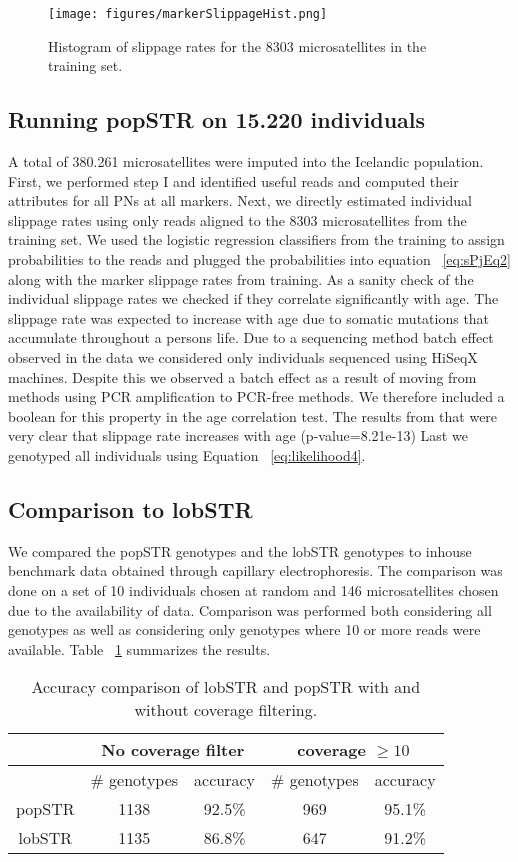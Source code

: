 \documentclass{bioinfo}
\begin{document}
\begin{figure}[H]
\centering
 \texttt{[image: figures/markerSlippageHist.png]}
  \caption[Histogram of marker-slippage]{Histogram of slippage rates for the 8303 microsatellites in the training set.}
 \label{fig:markerSlipp}
\end{figure}

\subsection{Running popSTR on 15.220 individuals}
A total of 380.261 microsatellites were imputed into the Icelandic population.
First, we performed step I and identified useful reads and computed their attributes for all PNs at all markers. Next, we directly estimated individual slippage rates using only reads aligned to the 8303 microsatellites from the training set. We used the logistic regression classifiers from the training to assign probabilities to the reads and plugged the probabilities into equation ~\ref{eq:sPjEq2} along with the marker slippage rates from training. 
As a sanity check of the individual slippage rates we checked if they correlate significantly with age. The slippage rate was expected to increase with age due to somatic mutations that accumulate throughout a persons life. Due to a sequencing method batch effect observed in the data we considered only individuals sequenced using HiSeqX machines. Despite this we observed a batch effect as a result of moving from methods using PCR amplification to PCR-free methods. We therefore included a boolean for this property in the age correlation test. The results from that were very clear that slippage rate increases with age (p-value=8.21e-13)
Last we genotyped all individuals using Equation ~\ref{eq:likelihood4}.

\subsection{Comparison to lobSTR}
We compared the popSTR genotypes and the lobSTR genotypes to inhouse benchmark data obtained through capillary electrophoresis. The comparison was done on a set of 10 individuals chosen at random and 146 microsatellites chosen due to the availability of data. 
Comparison was performed both considering all genotypes as well as considering only genotypes where 10 or more reads were available. Table ~\ref{table:lobSTRcomp} summarizes the results. 
\begin{table}[H]
    \caption{Accuracy comparison of lobSTR and popSTR with and without coverage filtering.}
    \begin{tabular}{ c | c | c | c | c |}
         & \multicolumn{2}{c}{No coverage filter} & \multicolumn{2}{c}{coverage $ \geq 10$} \\
         \hline
         & \# genotypes & accuracy & \# genotypes & accuracy \\
         \hline
        popSTR & 1138 & 92.5\% & 969 & 95.1\% \\
        \hline
        lobSTR & 1135 & 86.8\% & 647 & 91.2\% \\
        \hline
    \end{tabular}
    \label{table:lobSTRcomp}
\end{table}
\end{document}
